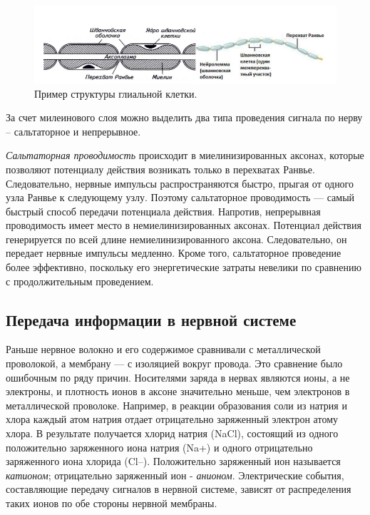 \documentclass{article}
\begin{document}
        \begin{figure}[h]
            \centering
            \includegraphics[width=\textwidth]{data/Глиальная клетка.png}
            \caption{Пример структуры глиальной клетки.}
        \end{figure}

        За счет милеинового слоя можно выделить два типа проведения сигнала по
        нерву – сальтаторное и непрерывное.
        \vspace*{4mm}

        \textit{Сальтаторная проводимость} происходит в миелинизированных аксонах,
        которые позволяют потенциалу действия возникать только в перехватах Ранвье.
        Следовательно, нервные импульсы распространяются быстро, прыгая от одного
        узла Ранвье к следующему узлу. Поэтому сальтаторное проводимость — самый
        быстрый способ передачи потенциала действия. Напротив, непрерывная
        проводимость имеет место в немиелинизированных аксонах. Потенциал
        действия генерируется по всей длине немиелинизированного аксона.
        Следовательно, он передает нервные импульсы медленно. Кроме того,
        сальтаторное проведение более эффективно, поскольку его энергетические
        затраты невелики по сравнению с продолжительным проведением.
        \newpage

        \subsection*{Передача информации в нервной системе}

        \hspace*{4mm} Раньше нервное волокно и его содержимое сравнивали с металлической
        проволокой, а мембрану — с изоляцией вокруг провода. Это сравнение было
        ошибочным по ряду причин. Носителями заряда в нервах являются ионы, а не
        электроны, и плотность ионов в аксоне значительно меньше, чем электронов в
        металлической проволоке. Например, в реакции образования соли из натрия и
        хлора каждый атом натрия отдает отрицательно заряженный электрон атому
        хлора. В результате получается хлорид натрия (NaCl), состоящий из одного
        положительно заряженного иона натрия (Na+) и одного отрицательно
        заряженного иона хлорида (Cl–). Положительно заряженный ион называется
        \textit{катионом}; отрицательно заряженный ион - \textit{анионом}. Электрические события,
        составляющие передачу сигналов в нервной системе, зависят от распределения
        таких ионов по обе стороны нервной мембраны.
        \vspace*{4mm}
\end{document}
